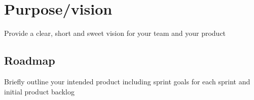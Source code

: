 \section{Purpose/vision}
Provide a clear, short and sweet vision for your team and your product
\subsection{Roadmap}
Briefly outline your intended product including sprint goals for each sprint and initial product backlog